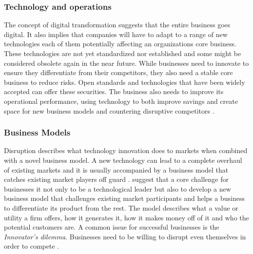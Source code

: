 \subsubsection{Technology and operations}
The concept of digital transformation suggests that the entire business goes digital. It also implies that companies will have to adapt to a range of new technologies %
 each of them potentially affecting an organizations core business. These technologies are not yet standardized nor established and some might be considered obsolete again in the near future. While businesses need to innovate to ensure they differentiate from their competitors, %
 they also need a stable core business to reduce risks. Open standards and technologies that have been widely accepted can offer these securities.
The business also needs to improve its operational performance, using technology to both improve savings and create space for new business models and countering disruptive competitors \cite[p.15ff.]{worldforumdigitalenterprise:2016}.


\subsubsection{Business Models}
Disruption describes what technology innovation does to markets when combined with a novel business model. A new technology can lead to a complete overhaul of existing markets and it is usually accompanied by a  business model that catches existing market players off guard \cite{LucasJr200946}. \citeauthor{gassmann:gallen:2013geschaeftsmodelle} suggest that a core challenge for businesses it not only to be a technological leader but also to develop a new business model that challenges existing market participants and helps a business to differentiate its product from the rest. The model describes what a value or utility a firm offers, how it generates it, how it makes money off of it and who the potential customers are. A common issue for successful businesses is the \emph{Innovator's dilemma}. Businesses need to be willing to disrupt even themselves in order to compete \cite{christensen1997innovator, worldforumdigitalenterprise:2016}.

